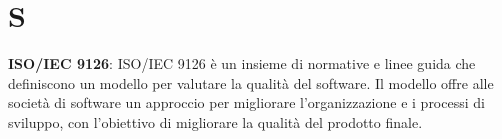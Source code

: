 \section{S}
\textbf{ISO/IEC 9126}: ISO/IEC 9126 è un insieme di normative e linee guida che definiscono un modello per valutare la qualità del software. Il modello offre alle società di software un approccio per migliorare l'organizzazione e i processi di sviluppo, con l'obiettivo di migliorare la qualità del prodotto finale.\\
